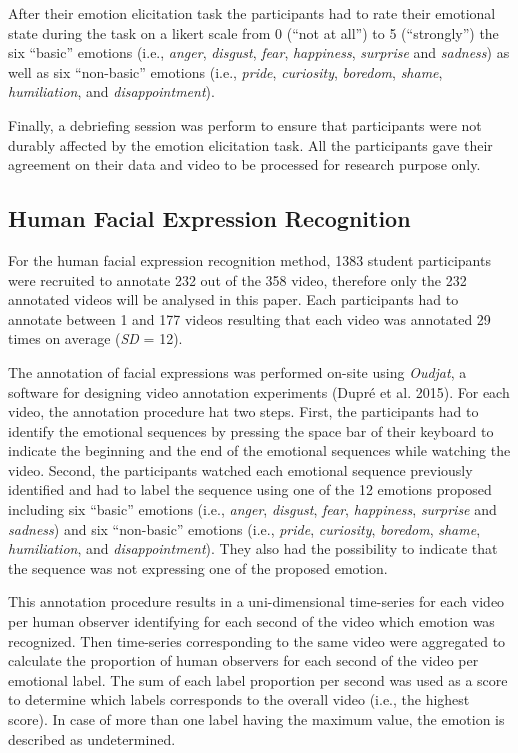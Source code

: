 \documentclass[conference,final,]{IEEEtran}
\begin{document}
After their emotion elicitation task the participants had to rate their
emotional state during the task on a likert scale from 0 (``not at
all'') to 5 (``strongly'') the six ``basic'' emotions (i.e.,
\emph{anger}, \emph{disgust}, \emph{fear}, \emph{happiness},
\emph{surprise} and \emph{sadness}) as well as six ``non-basic''
emotions (i.e., \emph{pride}, \emph{curiosity}, \emph{boredom},
\emph{shame}, \emph{humiliation}, and \emph{disappointment}).

Finally, a debriefing session was perform to ensure that participants
were not durably affected by the emotion elicitation task. All the
participants gave their agreement on their data and video to be
processed for research purpose only.

\hypertarget{human-facial-expression-recognition}{%
\subsection{Human Facial Expression
Recognition}\label{human-facial-expression-recognition}}

For the human facial expression recognition method, 1383 student
participants were recruited to annotate 232 out of the 358 video,
therefore only the 232 annotated videos will be analysed in this paper.
Each participants had to annotate between 1 and 177 videos resulting
that each video was annotated 29 times on average (\emph{SD} = 12).

The annotation of facial expressions was performed on-site using
\emph{Oudjat}, a software for designing video annotation experiments
(Dupré et al. 2015). For each video, the annotation procedure hat two
steps. First, the participants had to identify the emotional sequences
by pressing the space bar of their keyboard to indicate the beginning
and the end of the emotional sequences while watching the video. Second,
the participants watched each emotional sequence previously identified
and had to label the sequence using one of the 12 emotions proposed
including six ``basic'' emotions (i.e., \emph{anger}, \emph{disgust},
\emph{fear}, \emph{happiness}, \emph{surprise} and \emph{sadness}) and
six ``non-basic'' emotions (i.e., \emph{pride}, \emph{curiosity},
\emph{boredom}, \emph{shame}, \emph{humiliation}, and
\emph{disappointment}). They also had the possibility to indicate that
the sequence was not expressing one of the proposed emotion.

This annotation procedure results in a uni-dimensional time-series for
each video per human observer identifying for each second of the video
which emotion was recognized. Then time-series corresponding to the same
video were aggregated to calculate the proportion of human observers for
each second of the video per emotional label. The sum of each label
proportion per second was used as a score to determine which labels
corresponds to the overall video (i.e., the highest score). In case of
more than one label having the maximum value, the emotion is described
as undetermined.
\end{document}
